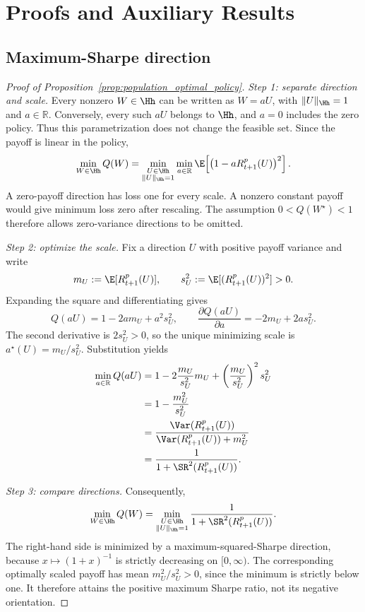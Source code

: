 \section{Proofs and Auxiliary Results}
\label{app:theory}
\label{app:learning_proof}
\setcounter{equation}{0}

\subsection{Maximum-Sharpe direction}
\label{app:maximum_sharpe}

\begin{proof}[Proof of Proposition~\ref{prop:population_optimal_policy}]
\textit{Step 1: separate direction and scale.}
Every nonzero $W\in\Hh$ can be written as $W=aU$, with
$\|U\|_{\Hh}=1$ and $a\in\mathbb R$. Conversely, every such $aU$ belongs
to $\Hh$, and $a=0$ includes the zero policy. Thus this parametrization does
not change the feasible set. Since the payoff is linear in the policy,
\[
\min_{W\in\Hh}Q(W)
=
\min_{\substack{U\in\Hh\\\|U\|_{\Hh}=1}}
\min_{a\in\mathbb R}
\E\!\left[\left(1-aR^p_{t+1}(U)\right)^2\right].
\]
A zero-payoff direction has loss one for every scale. A nonzero constant
payoff would give minimum loss zero after rescaling. The assumption
$0<Q(W^\star)<1$ therefore allows zero-variance directions to be omitted.

\medskip
\noindent\textit{Step 2: optimize the scale.}
Fix a direction $U$ with positive payoff variance and write
\[
m_U:=\E[R^p_{t+1}(U)],
\qquad
s_U^2:=\E[(R^p_{t+1}(U))^2]>0.
\]
Expanding the square and differentiating gives
\[
Q(aU)=1-2am_U+a^2s_U^2,
\qquad
\frac{\partial Q(aU)}{\partial a}=-2m_U+2as_U^2.
\]
The second derivative is $2s_U^2>0$, so the unique minimizing scale is
$a^\star(U)=m_U/s_U^2$. Substitution yields
\[
\begin{aligned}
\min_{a\in\mathbb R}Q(aU)
&=1-2\frac{m_U}{s_U^2}m_U
 +\left(\frac{m_U}{s_U^2}\right)^2s_U^2\\
&=1-\frac{m_U^2}{s_U^2}\\
&=\frac{\Var(R^p_{t+1}(U))}
        {\Var(R^p_{t+1}(U))+m_U^2}\\
&=\frac{1}{1+\SR^2(R^p_{t+1}(U))}.
\end{aligned}
\]

\medskip
\noindent\textit{Step 3: compare directions.}
Consequently,
\[
\min_{W\in\Hh}Q(W)
=
\min_{\substack{U\in\Hh\\\|U\|_{\Hh}=1}}
\frac{1}{1+\SR^2(R^p_{t+1}(U))}.
\]
The right-hand side is minimized by a maximum-squared-Sharpe direction,
because $x\mapsto(1+x)^{-1}$ is strictly decreasing on $[0,\infty)$.
The corresponding optimally scaled payoff has mean
$m_U^2/s_U^2>0$, since the minimum is strictly below one. It therefore
attains the positive maximum Sharpe ratio, not its negative orientation.
\end{proof}

